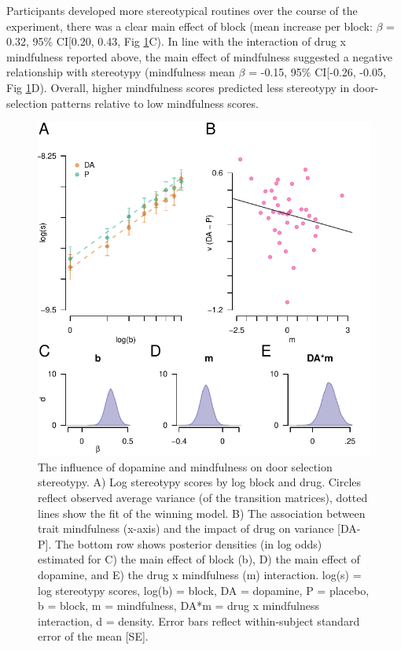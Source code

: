 \documentclass{article}
\begin{document}
Participants developed more stereotypical routines over the course of
the experiment, there was a clear main effect of block (mean increase
per block: \(\beta\) = 0.32, 95\% CI{[}0.20, 0.43, Fig
\ref{fig:stereofig}C). In line with the interaction of drug x
mindfulness reported above, the main effect of mindfulness suggested a
negative relationship with stereotypy (mindfulness mean \(\beta\) =
-0.15, 95\% CI{[}-0.26, -0.05, Fig \ref{fig:stereofig}D). Overall,
higher mindfulness scores predicted less stereotypy in door-selection
patterns relative to low mindfulness scores.

\begin{figure}

{\centering \includegraphics[width=0.7\linewidth]{../../images/s_fig} 

}

\caption{The influence of dopamine and mindfulness on door selection stereotypy. A) Log stereotypy scores by log block and drug. Circles reflect observed average variance (of the transition matrices), dotted lines show the fit of the winning model. B) The association between trait mindfulness (x-axis) and the impact of drug on variance [DA-P]. The bottom row shows posterior densities (in log odds) estimated for C) the main effect of block (b), D) the main effect of dopamine, and E) the drug x mindfulness (m) interaction. log(s) = log stereotypy scores, log(b) = block, DA = dopamine, P = placebo, b = block, m = mindfulness, DA*m = drug x mindfulness interaction, d = density. Error bars reflect within-subject standard error of the mean [SE].}\label{fig:stereofig}
\end{figure}
\end{document}
